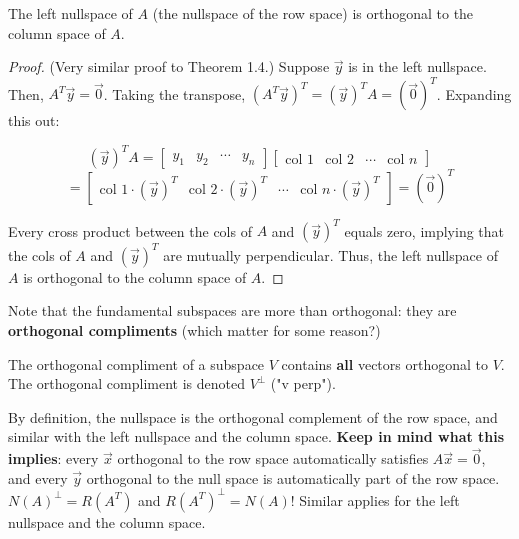 \documentclass{article}
\begin{document}
\begin{theorem}
    The left nullspace of $A$ (the nullspace of the row space) is orthogonal to the column space of $A$.
    \begin{proof}
        (Very similar proof to Theorem 1.4.)
        Suppose $\vec{y}$ is in the left nullspace.
        Then, $A^T \vec{y} = \vec{0}$. Taking the transpose, $(A^T \vec{y})^T = (\vec{y})^T A = (\vec{0})^T$.
        Expanding this out:

        \[(\vec{y})^T A =
        \begin{bmatrix} %
            y_1& y_2& \cdots& y_n
        \end{bmatrix}
        \begin{bmatrix} %
            \textrm{col 1}& \textrm{col 2}& \cdots& \textrm{col $n$}
        \end{bmatrix}
        \]
        \[
        =
        \begin{bmatrix} %
            \textrm{col 1} \cdot (\vec{y})^T & \textrm{col 2} \cdot (\vec{y})^T& \cdots& \textrm{col $n$} \cdot (\vec{y})^T
        \end{bmatrix}
        =
        (\vec{0})^T
        \]

        Every cross product between the cols of $A$ and $(\vec{y})^T$ equals zero, implying that the cols of $A$ and $(\vec{y})^T$ are mutually perpendicular.
        Thus, the left nullspace of $A$ is orthogonal to the column space of $A$.
    \end{proof}
\end{theorem}

Note that the fundamental subspaces are more than orthogonal: they are \textbf{orthogonal compliments} (which matter for some reason?)

\begin{definition}
    The orthogonal compliment of a subspace $V$ contains \textbf{all} vectors orthogonal to $V$.
    The orthogonal compliment is denoted $V^\perp$ ("v perp").
\end{definition}

By definition, the nullspace is the orthogonal complement of the row space, and similar with the left nullspace and the column space.
\textbf{Keep in mind what this implies}: every $\vec{x}$ orthogonal to the row space automatically satisfies $A\vec{x} = \vec{0}$, and every $\vec{y}$ orthogonal to the null space is automatically part of the row space.
$N(A)^\perp = R(A^T)$ and $R(A^T)^\perp = N(A)$!
Similar applies for the left nullspace and the column space.
\end{document}
